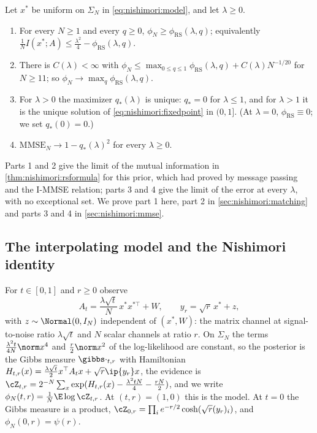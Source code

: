\begin{refsection}
\begin{theorem}\label{thm:nishimori:z2}
Let $x^*$ be uniform on $\Sigma_N$ in \eqref{eq:nishimori:model}, and let $\lambda\ge0$.
\begin{enumerate}
\item For every $N\ge1$ and every $q\ge0$, $\phi_N\ge\phi_{\mathrm{RS}}(\lambda,q)$; equivalently $\frac1NI(x^*;A)\le\frac{\lambda^2}4-\phi_{\mathrm{RS}}(\lambda,q)$.
\item There is $C(\lambda)<\infty$ with $\phi_N\le\max_{0\le q\le1}\phi_{\mathrm{RS}}(\lambda,q)+C(\lambda)N^{-1/20}$ for $N\ge11$; so $\phi_N\to\max_q\phi_{\mathrm{RS}}(\lambda,q)$.
\item For $\lambda>0$ the maximizer $q_*(\lambda)$ is unique: $q_*=0$ for $\lambda\le1$, and for $\lambda>1$ it is the unique solution of \eqref{eq:nishimori:fixedpoint} in $(0,1]$. (At $\lambda=0$, $\phi_{\mathrm{RS}}\equiv0$; we set $q_*(0)=0$.)
\item $\mathrm{MMSE}_N\to1-q_*(\lambda)^2$ for every $\lambda\ge0$.
\end{enumerate}
\end{theorem}

Parts 1 and 2 give the limit of the mutual information in \cref{thm:nishimori:rsformula} for this prior, which \textcite[Theorem~4.3]{DeshpandeAbbeMontanari2016} had proved by message passing and the I-MMSE relation; parts 3 and 4 give the limit of the error at every $\lambda$, with no exceptional set. We prove part 1 here, part 2 in \cref{sec:nishimori:matching} and parts 3 and 4 in \cref{sec:nishimori:mmse}.

\subsection{The interpolating model and the Nishimori identity}\label{sec:nishimori:interp}

For $t\in[0,1]$ and $r\ge0$ observe
\begin{equation}\label{eq:nishimori:interp}
A_t=\frac{\lambda\sqrt t}N\,x^*x^{*\top}+W,\qquad y_r=\sqrt r\,x^*+z,
\end{equation}
with $z\sim\Normal(0,I_N)$ independent of $(x^*,W)$: the matrix channel at signal-to-noise ratio $\lambda\sqrt t$ and $N$ scalar channels at ratio $r$. On $\Sigma_N$ the terms $\frac{\lambda^2t}{4N}\norm x^4$ and $\frac r2\norm x^2$ of the log-likelihood are constant, so the posterior is the Gibbs measure $\gibbs\cdot_{t,r}$ with Hamiltonian $H_{t,r}(x)=\frac{\lambda\sqrt t}2x^\top A_tx+\sqrt r\ip{y_r}x$, the evidence is $\cZ_{t,r}=2^{-N}\sum_x\exp(H_{t,r}(x)-\frac{\lambda^2tN}4-\frac{rN}2)$, and we write $\phi_N(t,r)=\frac1N\E\log\cZ_{t,r}$. At $(t,r)=(1,0)$ this is the model. At $t=0$ the Gibbs measure is a product, $\cZ_{0,r}=\prod_ie^{-r/2}\cosh(\sqrt r(y_r)_i)$, and $\phi_N(0,r)=\psi(r)$.


\end{refsection}
